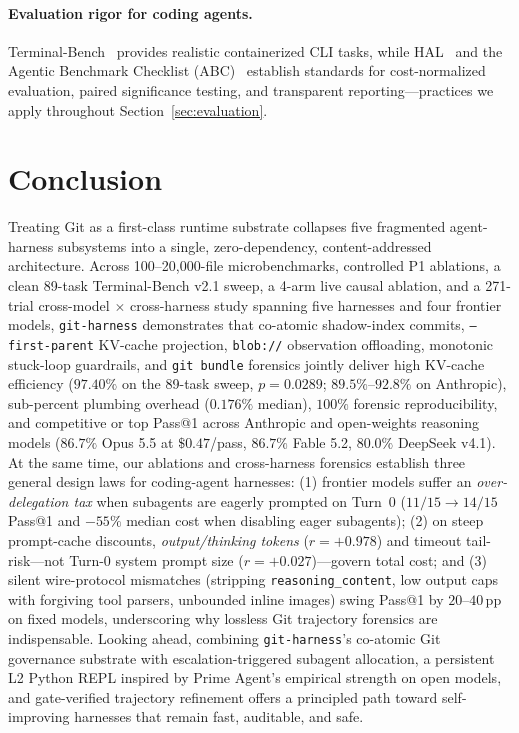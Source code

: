 \documentclass[11pt]{article}
\begin{document}
\paragraph{Evaluation rigor for coding agents.}
Terminal-Bench~\citep{merrill2026terminalbench} provides realistic containerized CLI tasks, while HAL~\citep{kapoor2026hal} and the Agentic Benchmark Checklist (ABC)~\citep{zhu2025abc} establish standards for cost-normalized evaluation, paired significance testing, and transparent reporting---practices we apply throughout Section~\ref{sec:evaluation}.

\section{Conclusion}
\label{sec:conclusion}

Treating Git as a first-class runtime substrate collapses five fragmented agent-harness subsystems into a single, zero-dependency, content-addressed architecture.
Across 100--20,000-file microbenchmarks, controlled P1 ablations, a clean 89-task Terminal-Bench v2.1 sweep, a 4-arm live causal ablation, and a 271-trial cross-model $\times$ cross-harness study spanning five harnesses and four frontier models, \texttt{git-harness} demonstrates that co-atomic shadow-index commits, \texttt{--first-parent} KV-cache projection, \texttt{blob://} observation offloading, monotonic stuck-loop guardrails, and \texttt{git bundle} forensics jointly deliver high KV-cache efficiency ($97.40\%$ on the 89-task sweep, $p = 0.0289$; $89.5\%\text{--}92.8\%$ on Anthropic), sub-percent plumbing overhead ($0.176\%$ median), $100\%$ forensic reproducibility, and competitive or top Pass@1 across Anthropic and open-weights reasoning models ($86.7\%$ Opus 5.5 at $\$0.47$/pass, $86.7\%$ Fable 5.2, $80.0\%$ DeepSeek v4.1).
At the same time, our ablations and cross-harness forensics establish three general design laws for coding-agent harnesses:
(1) frontier models suffer an \emph{over-delegation tax} when subagents are eagerly prompted on Turn~0 ($11/15 \to 14/15$ Pass@1 and $-55\%$ median cost when disabling eager subagents);
(2) on steep prompt-cache discounts, \emph{output/thinking tokens} ($r = +0.978$) and timeout tail-risk---not Turn-0 system prompt size ($r = +0.027$)---govern total cost; and
(3) silent wire-protocol mismatches (stripping \texttt{reasoning\_content}, low output caps with forgiving tool parsers, unbounded inline images) swing Pass@1 by $20\text{--}40\,\mathrm{pp}$ on fixed models, underscoring why lossless Git trajectory forensics are indispensable.
Looking ahead, combining \texttt{git-harness}'s co-atomic Git governance substrate with escalation-triggered subagent allocation, a persistent L2 Python REPL inspired by Prime Agent's empirical strength on open models, and gate-verified trajectory refinement offers a principled path toward self-improving harnesses that remain fast, auditable, and safe.
\end{document}
